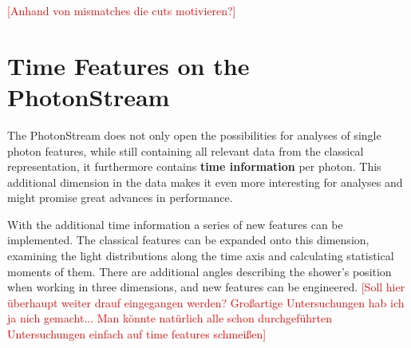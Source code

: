 %
\textcolor{red}{[Anhand von mismatches die cuts motivieren?]}

\section{Time Features on the PhotonStream}
%
The PhotonStream does not only open the possibilities for analyses of single
photon features, while still containing all relevant data from the classical
representation, it furthermore contains \textbf{time information} per photon.
This additional dimension in the data makes it even more interesting for
analyses and might promise great advances in performance.

With the additional time information a series of new features can be
implemented. The classical features can be expanded onto this dimension,
examining the light distributions along the time axis and calculating
statistical moments of them. There are additional angles describing the
shower's position when working in three dimensions, and new features can be
engineered. \textcolor{red}{[Soll hier überhaupt weiter drauf eingegangen werden? Großartige Untersuchungen hab ich ja nich gemacht... Man könnte natürlich alle schon durchgeführten Untersuchungen einfach auf time features schmeißen]}
%
